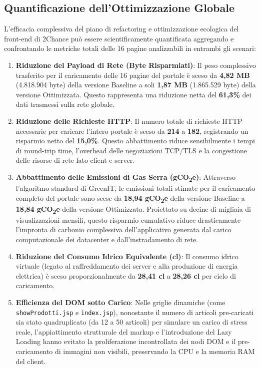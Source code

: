 \subsection{Quantificazione dell'Ottimizzazione Globale}

L'efficacia complessiva del piano di refactoring e ottimizzazione ecologica del front-end di 2Chance può essere scientificamente quantificata aggregando e confrontando le metriche totali delle 16 pagine analizzabili in entrambi gli scenari:

\begin{enumerate}
    \item \textbf{Riduzione del Payload di Rete (Byte Risparmiati)}:
    Il peso complessivo trasferito per il caricamento delle 16 pagine del portale è sceso da \textbf{4,82 MB} (4.818.904 byte) della versione Baseline a soli \textbf{1,87 MB} (1.865.529 byte) della versione Ottimizzata. Questo rappresenta una riduzione netta del \textbf{61,3\%} dei dati trasmessi sulla rete globale.
    
    \item \textbf{Riduzione delle Richieste HTTP}:
    Il numero totale di richieste HTTP necessarie per caricare l'intero portale è sceso da \textbf{214} a \textbf{182}, registrando un risparmio netto del \textbf{15,0\%}. Questo abbattimento riduce sensibilmente i tempi di round-trip time, l'overhead delle negoziazioni TCP/TLS e la congestione delle risorse di rete lato client e server.

    \item \textbf{Abbattimento delle Emissioni di Gas Serra (gCO\textsubscript{2}e)}:
    Attraverso l'algoritmo standard di GreenIT, le emissioni totali stimate per il caricamento completo del portale sono scese da \textbf{18,94 gCO\textsubscript{2}e} della versione Baseline a \textbf{18,84 gCO\textsubscript{2}e} della versione Ottimizzata. Proiettato su decine di migliaia di visualizzazioni mensili, questo risparmio cumulativo riduce drasticamente l'impronta di carbonio complessiva dell'applicativo generata dal carico computazionale dei datacenter e dall'instradamento di rete.

    \item \textbf{Riduzione del Consumo Idrico Equivalente (cl)}:
    Il consumo idrico virtuale (legato al raffreddamento dei server e alla produzione di energia elettrica) è sceso proporzionalmente da \textbf{28,41 cl} a \textbf{28,26 cl} per ciclo di caricamento.
    
    \item \textbf{Efficienza del DOM sotto Carico}:
    Nelle griglie dinamiche (come \texttt{showProdotti.jsp} e \texttt{index.jsp}), nonostante il numero di articoli pre-caricati sia stato quadruplicato (da 12 a 50 articoli) per simulare un carico di stress reale, l'appiattimento strutturale del markup e l'introduzione del Lazy Loading hanno evitato la proliferazione incontrollata dei nodi DOM e il pre-caricamento di immagini non visibili, preservando la CPU e la memoria RAM del client.
\end{enumerate}